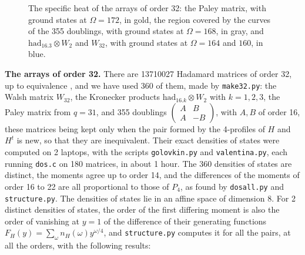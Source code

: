 \documentclass[11pt,a4paper]{article}
\theoremstyle{remark}
\begin{document}
\begin{figure}[htb!]
\caption{The specific heat of the arrays of order 32: the Paley matrix, with ground states at $\Omega=172$, in gold, the region covered by the curves of the 355 doublings, with ground states at $\Omega=168$, in gray, and $\mathrm{had}_{16.3}\otimes W_2$ and $W_{32}$, with ground states at $\Omega=164$ and $160$, in blue.}\label{fig:order32}
\end{figure}

\noindent\textbf{The arrays of order 32.} There are 13710027 Hadamard matrices of order 32, up to equivalence \cite{kta}, and we have used 360 of them, made by \texttt{make32.py}: the Walsh matrix $W_{32}$, the Kronecker products $\mathrm{had}_{16.k}\otimes W_2$ with $k=1,2,3$, the Paley matrix from $q=31$, and 355 doublings $\begin{pmatrix}A&B\\A&-B\end{pmatrix}$, with $A,B$ of order 16, these matrices being kept only when the pair formed by the 4-profiles of $H$ and $H^t$ is new, so that they are inequivalent. Their exact densities of states were computed on 2 laptops, with the scripts \texttt{golovkin.py} and \texttt{valentina.py}, each running \texttt{dos.c} on 180 matrices, in about 1 hour. The 360 densities of states are distinct, the moments agree up to order 14, and the differences of the moments of order 16 to 22 are all proportional to those of $P_4$, as found by \texttt{dosall.py} and \texttt{structure.py}. The densities of states lie in an affine space of dimension 8. For 2 distinct densities of states, the order of the first differing moment is also the order of vanishing at $y=1$ of the difference of their generating functions $F_H(y)=\sum_\omega n_H(\omega)y^{\omega/4}$, and \texttt{structure.py} computes it for all the pairs, at all the orders, with the following results:
\end{document}
